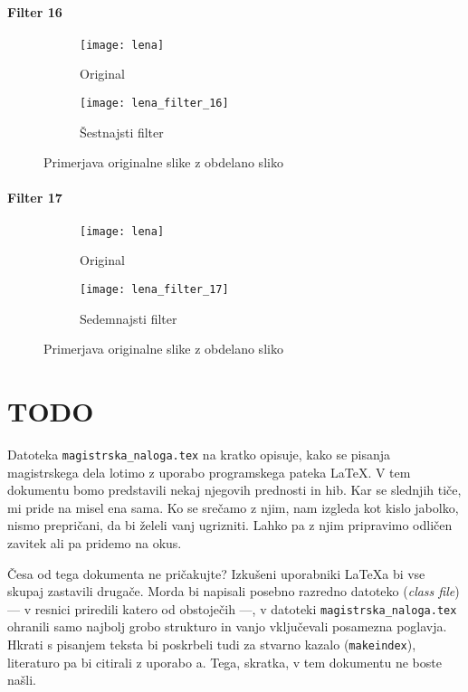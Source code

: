 \subsubsection*{Filter 16}
\begin{figure}[h]
    \centering
    \begin{subfigure}[b]{0.4\textwidth}
        \texttt{[image: lena]}
        \caption{Original}
    \end{subfigure}
    \begin{subfigure}[b]{0.4\textwidth}
        \texttt{[image: lena\_filter\_16]}
        \caption{Šestnajsti filter}
    \end{subfigure}
    \caption{Primerjava originalne slike z obdelano sliko}
    \label{fig:lena_filter_16}
\end{figure}


\subsubsection*{Filter 17}
\begin{figure}[h]
    \centering
    \begin{subfigure}[b]{0.4\textwidth}
        \texttt{[image: lena]}
        \caption{Original}
    \end{subfigure}
    \begin{subfigure}[b]{0.4\textwidth}
        \texttt{[image: lena\_filter\_17]}
        \caption{Sedemnajsti filter}
    \end{subfigure}
    \caption{Primerjava originalne slike z obdelano sliko}
    \label{fig:lena_filter_17}
\end{figure}

\chapter{TODO}
Datoteka {\tt magistrska\_naloga.tex} na kratko opisuje, kako se pisanja
magistrskega dela lotimo z uporabo programskega pateka \LaTeX. V tem dokumentu
bomo predstavili nekaj njegovih prednosti in hib. Kar se slednjih tiče, mi
pride na misel ena sama. Ko se srečamo z njim, nam izgleda kot kislo jabolko,
nismo prepričani, da bi želeli vanj ugrizniti. Lahko pa z njim pripravimo
odličen zavitek ali pa pridemo na okus.

Česa od tega dokumenta ne pričakujte? Izkušeni uporabniki \LaTeX{}a bi vse
skupaj zastavili drugače. Morda bi napisali posebno razredno datoteko
(\emph{class file}) --- v resnici priredili katero od obstoječih ---, v
datoteki {\tt magistrska\_naloga.tex} ohranili samo najbolj grobo strukturo in
vanjo vključevali  posamezna po\-glav\-ja. Hkrati s pisanjem teksta bi
poskrbeli tudi za stvarno kazalo ({\tt makeindex}), literaturo pa bi citirali
z uporabo {\BibTeX}{a}. Tega, skratka, v tem dokumentu ne boste našli.

